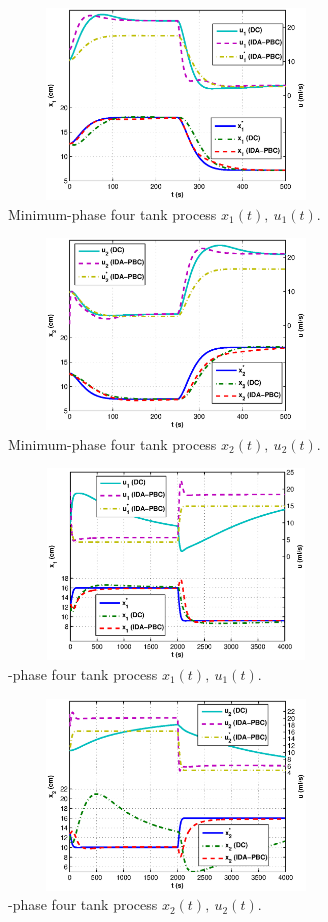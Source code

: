 \begin{figure}
  \centering
  \includegraphics*[width=3.5in,height=2in, viewport=20 10 410 300]{figures/min_phase_x1_u1}
  \caption{Minimum-phase four tank process $x_1(t),\ u_1(t)$.}
  \label{F:four_tank_min_phase_x1}
\end{figure}
\begin{figure}
  \centering
  \includegraphics*[width=3.5in,height=2in, viewport=20 10 410 300]{figures/min_phase_x2_u2}
  \caption{Minimum-phase four tank process $x_2(t),\ u_2(t)$.}
 \label{F:four_tank_min_phase_x2}
\end{figure}
\begin{figure}
  \centering
  \includegraphics*[width=3.5in,height=2in, viewport=20 10 410 300]{figures/nonmin_phase_x1_u1}
  \caption{\Nonminimum-phase four tank process $x_1(t),\ u_1(t)$.}
  \label{F:four_tank_nonmin_phase_x1}
\end{figure}
\begin{figure}
  \centering
  \includegraphics*[width=3.5in,height=2in, viewport=20 10 410 300]{figures/nonmin_phase_x2_u2}
  \caption{\Nonminimum-phase four tank process $x_2(t),\ u_2(t)$.}
  \label{F:four_tank_nonmin_phase_x2}
\end{figure}
